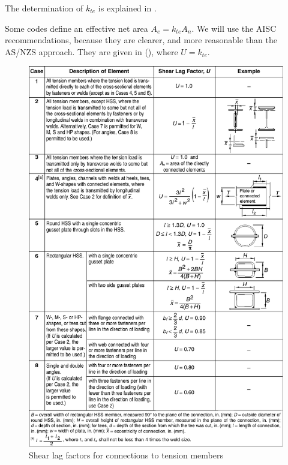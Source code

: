 The determination of $k_{te}$ is explained in .

Some codes define an effective net area $A_e=k_{te}A_n$. We will use the AISC recommendations, because they are clearer, and more reasonable than the AS/NZS approach. They are given in  (), where $U=k_{te}$.
\begin{figure}[p]
\centering
\includegraphics[width=.99\textwidth]{PIC/CH03/SHEAR.LAG}
\caption{Shear lag factors for connections to tension members}
\label{fig:shear_lag}
\end{figure}
